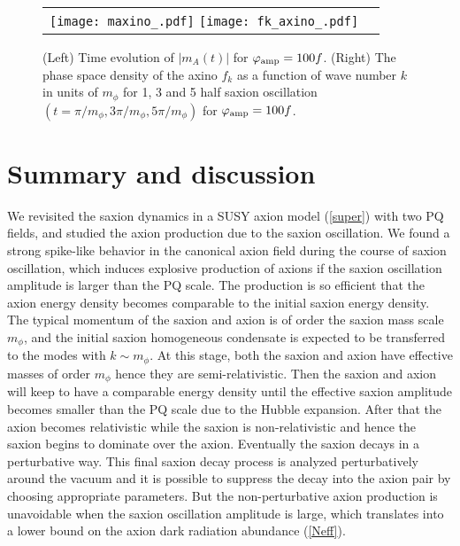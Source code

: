 \documentclass[12pt, a4paper]{article}
\begin{document}
\begin{figure}[t]
\begin{center}
\begin{tabular}{cc}
\texttt{[image: maxino\_.pdf]}
\hspace{5mm}
\texttt{[image: fk\_axino\_.pdf]}
\end{tabular}
\end{center}
\caption {
(Left) Time evolution of $|m_A(t)|$ for $\varphi_{\rm amp} = 100f$.
(Right) The phase space density of the axino $f_k$ as a function of wave number $k$ in units of $m_\phi$
for 1, 3 and 5 half saxion oscillation $(t=\pi/m_\phi, 3\pi/m_\phi, 5\pi/m_\phi)$ for $\varphi_{\rm amp} = 100f$.
}
\label{fig:fk_axino}
\end{figure}


\section{Summary and discussion}  \label{sec:dis}


We revisited the saxion dynamics in a SUSY axion model (\ref{super}) with two PQ fields,
and studied the axion production due to the saxion oscillation.
We found a strong spike-like behavior in the canonical axion field during the course of saxion oscillation,
which induces explosive production of axions if the saxion oscillation amplitude is larger than the PQ scale.
The production is so efficient that the axion energy density becomes comparable to the initial saxion energy density.
The typical momentum of the saxion and axion is of order the saxion mass scale $m_\phi$, and 
the initial saxion homogeneous condensate is expected to be transferred to the modes with $k \sim m_\phi$.
At this stage, both the saxion and axion have effective masses of order $m_\phi$ hence they are semi-relativistic.
Then the saxion and axion will keep to have a comparable energy density until the effective saxion amplitude becomes smaller than the PQ scale
due to the Hubble expansion.
After that the axion becomes relativistic while the saxion is non-relativistic and hence the saxion begins to dominate over the axion.
Eventually the saxion decays in a perturbative way.
This final saxion decay process is analyzed perturbatively around the vacuum and it is possible to suppress the 
decay into the axion pair by choosing appropriate parameters.
But the non-perturbative axion production is unavoidable when the saxion oscillation amplitude is large,
which translates into a lower bound on the axion dark radiation abundance (\ref{Neff}).
\end{document}
